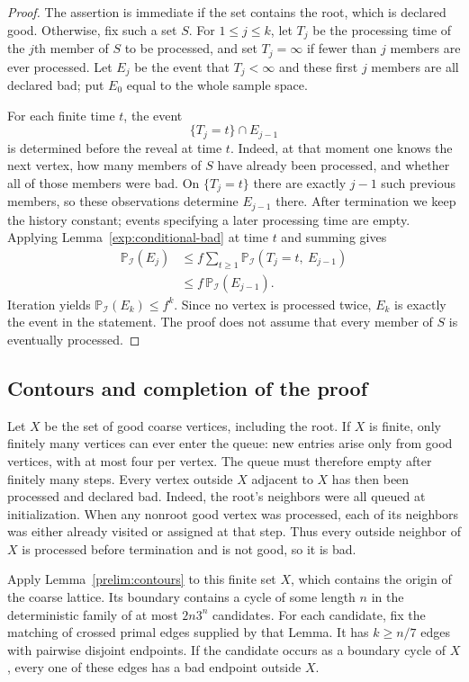 \begin{proof}
The assertion is immediate if the set contains the root, which is
declared good. Otherwise, fix such a set $S$. For $1\le j\le k$, let
$T_j$ be the processing time of the $j$th member of $S$ to be processed,
and set $T_j=\infty$ if fewer than $j$ members are ever processed. Let
$E_j$ be the event that $T_j<\infty$ and these first $j$ members are
all declared bad; put $E_0$ equal to the whole sample space.

For each finite time $t$, the event
\[
 \{T_j=t\}\cap E_{j-1}
\]
is determined before the reveal at time $t$. Indeed, at that moment
one knows the next vertex, how many members of $S$ have already
been processed, and whether all of those members were bad.
On $\{T_j=t\}$ there are exactly $j-1$ such previous members,
so these observations determine $E_{j-1}$ there.
After termination we keep the history constant; events specifying
a later processing time are empty. Applying
Lemma~\ref{exp:conditional-bad} at time $t$ and summing gives
\begin{align*}
 \mathbb P_{\mathcal I}(E_j)
 &\le f\sum_{t\ge1}
       \mathbb P_{\mathcal I}(T_j=t,\ E_{j-1})\\
 &\le f\,\mathbb P_{\mathcal I}(E_{j-1}).
\end{align*}
Iteration yields $\mathbb P_{\mathcal I}(E_k)\le f^k$. Since no
vertex is processed twice, $E_k$ is exactly the event in the statement.
The proof does not assume that every member of $S$ is eventually
processed.
\end{proof}

\subsection{Contours and completion of the proof}

Let $X$ be the set of good coarse vertices, including the root. If $X$
is finite, only finitely many vertices can ever enter the queue: new
entries arise only from good vertices, with at most four per vertex.
The queue must therefore empty after finitely many steps. Every vertex
outside $X$ adjacent to $X$ has then been processed and declared bad.
Indeed, the root's neighbors were all queued at initialization. When
any nonroot good vertex was processed, each of its neighbors was either
already visited or assigned at that step. Thus every outside neighbor
of $X$ is processed before termination and is not good, so it is bad.

Apply Lemma~\ref{prelim:contours} to this finite set $X$, which contains
the origin of the coarse lattice. Its boundary contains a cycle of
some length $n$ in the deterministic family of at most $2n3^n$
candidates. For each candidate, fix the matching of crossed primal
edges supplied by that Lemma. It has $k\ge n/7$ edges with pairwise
disjoint endpoints. If the candidate occurs as a boundary cycle of
$X$, every one of these edges has a bad endpoint outside $X$.

